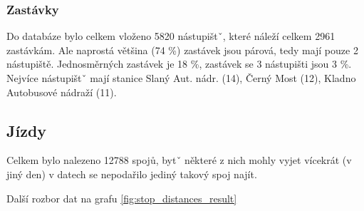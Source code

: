 \subsubsection{Zastávky}

Do databáze bylo celkem vloženo 5820 nástupištˇ, které náleží celkem 2961 zastávkám. Ale naprostá většina (74 \%) zastávek jsou párová, tedy mají pouze 2 nástupiště. Jednosměrných zastávek je 18 \%, zastávek se 3 nástupišti jsou 3 \%. Nejvíce nástupištˇ mají stanice Slaný Aut. nádr. (14), Černý Most (12), Kladno Autobusové nádraží (11).

\subsection{Jízdy}

Celkem bylo nalezeno 12788 spojů, bytˇ některé z nich mohly vyjet vícekrát (v jiný den) v datech se nepodařilo jediný takový spoj najít.

Další rozbor dat na grafu \ref{fig:stop_distances_result}
